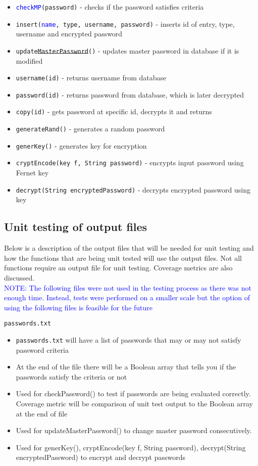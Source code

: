 \documentclass[12pt, titlepage]{article}
\begin{document}
\begin{itemize}
    \item \texttt{\textcolor{blue}{checkMP}(password)} - checks if the password satisfies criteria
    \item \texttt{insert(\textcolor{blue}{name}, type, username, password)} - inserts id of entry, type, username and encrypted password
    \item \texttt{update\sout{MasterPassword}()} - updates master password in database if it is modified    
    \item \texttt{username(id)} - returns username from database
    
    \item \texttt{password(id)} - returns password from database, which is later decrypted
    \item \texttt{copy(id)} - gets password at specific id, decrypts it and returns
    \item \texttt{generateRand()} - generates a random password
    \item \texttt{generKey()} - generates key for encryption
    \item \texttt{cryptEncode(key f, String password)} - encrypts input password using Fernet key
    \item \texttt{decrypt(String encryptedPassword)} - decrypts encrypted password using key
\end{itemize}

\subsection{Unit testing of output files}		

Below is a description of the output files that will be needed for unit testing and how the functions that are being unit tested will use the output files. Not all functions require an output file for unit testing. Coverage metrics are also discussed.\\
\textcolor{blue}{NOTE: The following files were not used in the testing process as there was not enough time. Instead, tests were performed on a smaller scale but the option of using the following files is feasible for the future}

\texttt{passwords.txt}
\begin{itemize}
    \item \texttt{passwords.txt} will have a list of passwords that may or may not satisfy password criteria 
    \item At the end of the file there will be a Boolean array that tells you if the passwords satisfy the criteria or not
    \item Used for checkPassword() to test if passwords are being evaluated correctly. Coverage metric will be comparison of unit test output to the Boolean array at the end of file
    \item Used for updateMasterPassword() to change master password consecutively.
    \item Used for generKey(), cryptEncode(key f, String password), decrypt(String encryptedPassword) to encrypt and decrypt passwords
\end{itemize}
\end{document}
